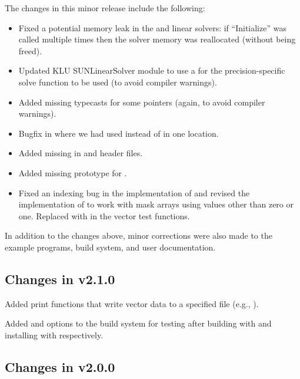The changes in this minor release include the following:
\begin{itemize}
\item Fixed a potential memory leak in the {\spgmr} and {\spfgmr} linear
  solvers: if ``Initialize'' was called multiple times then the solver
  memory was reallocated (without being freed).

\item Updated KLU SUNLinearSolver module to use a  for the
  precision-specific solve function to be used (to avoid compiler
  warnings).

\item Added missing typecasts for some  pointers (again, to
  avoid compiler warnings).

\item Bugfix in  where we had used 
  instead of  in one location.

\item Added missing  in {\nvector} and {\sunmatrix}
  header files.

\item Added missing prototype for .

\item Fixed an indexing bug in the {\cuda} {\nvector} implementation of
   and revised the {\raja} {\nvector} implementation of
   to work with mask arrays using values other than zero or
  one. Replaced  with  in the {\raja} vector test functions.
\end{itemize}
In addition to the changes above, minor corrections were also made to the
example programs, build system, and user documentation.

\subsection*{Changes in v2.1.0}

Added {\nvector} print functions that write vector data to a specified
file (e.g., ).

Added  and  options to the build
system for testing {\sundials} after building with  and
installing with  respectively.

\subsection*{Changes in v2.0.0}

